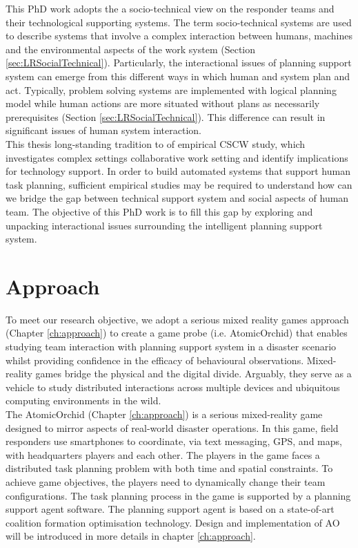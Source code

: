 This PhD work adopts the a socio-technical view on the responder teams and their technological supporting systems. The term socio-technical systems are used to describe systems that involve a complex interaction between humans, machines and the environmental aspects of the work system (Section \ref{sec:LRSocialTechnical}). Particularly, the interactional issues of planning support system can emerge from this different ways in which human and system plan and act. Typically, problem solving systems are implemented with logical planning model while human actions are more situated without plans as necessarily prerequisites (Section \ref{sec:LRSocialTechnical}). This difference can result in significant issues of human system interaction.\\

This thesis long-standing tradition to of empirical \ac{CSCW} study, which investigates complex settings collaborative work setting and identify implications for technology support. In order to build automated systems that support human task planning, sufficient empirical studies may be required to understand how can we bridge the gap between technical support system and social aspects of human team.  The objective of this PhD work is to fill this gap by exploring and unpacking interactional issues surrounding the intelligent planning support system.\\

\section{Approach}\label{sec:custom}


To meet our research objective, we adopt a serious mixed reality games approach (Chapter \ref{ch:approach}) to create a game probe (i.e. AtomicOrchid) that enables studying team interaction with planning support system in a disaster scenario whilst providing confidence in the efficacy of behavioural observations. Mixed-reality games bridge the physical and the digital divide. Arguably, they serve as a vehicle to study distributed interactions across multiple devices and ubiquitous computing environments in the wild.\\

The AtomicOrchid (Chapter \ref{ch:approach}) is a serious mixed-reality game designed to mirror aspects of real-world disaster operations. In this game, field responders use smartphones to coordinate, via text messaging, GPS, and maps, with headquarters players and each other. The players in the game faces a distributed task planning problem with both time and spatial constraints. To achieve game objectives, the players need to dynamically change their team configurations. The task planning process in the game is supported by a planning support agent software. The planning support agent is based on a state-of-art coalition formation optimisation technology. Design and implementation of \acf{AO} will be introduced in more details in chapter \ref{ch:approach}.\\

